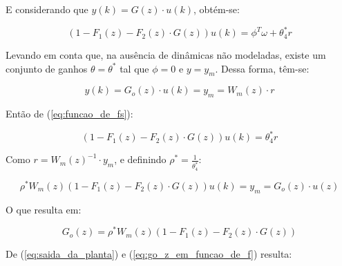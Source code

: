     E considerando que $y(k) = G(z) \cdot u(k)$, obtém-se:

    \begin{equation}
        \left( 1 - F_1(z) - F_2(z) \cdot G(z) \right) u(k) = \phi^T \omega + \theta_4^* r
        \label{eq:funcao_de_fs}
    \end{equation}

    Levando em conta que, na ausência de dinâmicas não modeladas, existe um conjunto de
    ganhos $\theta = \theta^*$ tal que $\phi = 0$ e $y = y_m$. Dessa forma, têm-se:

    \begin{equation}
        y(k) = G_o(z) \cdot u(k) = y_m = W_m(z) \cdot r
    \end{equation}

    Então de (\ref{eq:funcao_de_fs}):

    \begin{equation}
        \left( 1 - F_1(z) - F_2(z) \cdot G(z) \right) u(k) = \theta_4^* r
    \end{equation}

    Como $r = W_m(z)^{-1} \cdot y_m$, e definindo $\rho^* = \frac{1}{\theta_4^*}$:

    \begin{equation*}
        \rho^* W_m(z) \left( 1 - F_1(z) - F_2(z) \cdot G(z) \right) u(k) = y_m = G_o(z) \cdot u(z)
    \end{equation*}

    O que resulta em:

    \begin{equation}
        G_o(z) = \rho^* W_m(z) \left( 1 - F_1(z) - F_2(z) \cdot G(z) \right)
        \label{eq:go_z_em_funcao_de_f}
    \end{equation}






    De (\ref{eq:saida_da_planta}) e (\ref{eq:go_z_em_funcao_de_f}) resulta:


